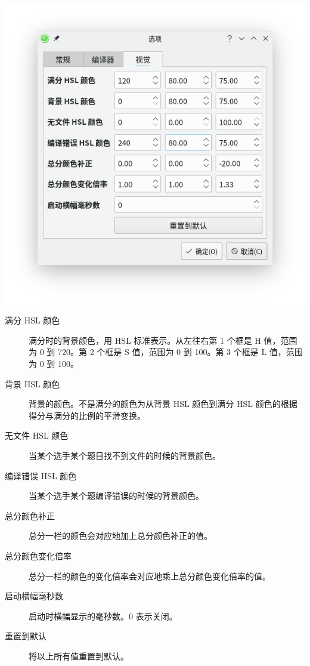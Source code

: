 \documentclass[UTF-8]{ctexart}
\begin{document}
				\begin{center}
				\includegraphics[scale=0.7]{pics/visualsettings.png}
				\end{center}

				\begin{description}
					\item[满分 HSL 颜色] 满分时的背景颜色，用 HSL 标准表示。从左往右第 1 个框是 H 值，范围为 0 到 720。第 2 个框是 S 值，范围为 0 到 100。第 3 个框是 L 值，范围为 0 到 100。
					\item[背景 HSL 颜色] 背景的颜色。不是满分的颜色为从背景 HSL 颜色到满分 HSL 颜色的根据得分与满分的比例的平滑变换。
					\item[无文件 HSL 颜色] 当某个选手某个题目找不到文件的时候的背景颜色。
					\item[编译错误 HSL 颜色] 当某个选手某个题编译错误的时候的背景颜色。
					\item[总分颜色补正] 总分一栏的颜色会对应地加上总分颜色补正的值。
					\item[总分颜色变化倍率] 总分一栏的颜色的变化倍率会对应地乘上总分颜色变化倍率的值。
					\item[启动横幅毫秒数] 启动时横幅显示的毫秒数。0 表示关闭。
					\item[重置到默认] 将以上所有值重置到默认。
				\end{description}
\end{document}

